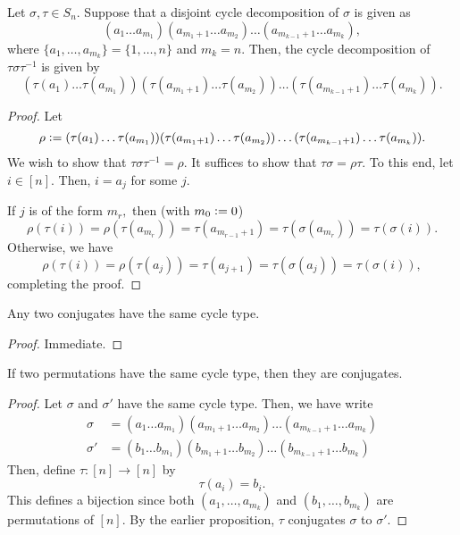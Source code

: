 \begin{prop}
	Let $\sigma, \tau \in S_n.$ Suppose that a disjoint cycle decomposition of $\sigma$ is given as
	\begin{equation*} 
		(a_1 \ldots a_{m_1})(a_{m_1 + 1} \ldots a_{m_2})\ldots(a_{m_{k-1} + 1} \ldots a_{m_k}),
	\end{equation*}
	where $\{a_1, \ldots, a_{m_k}\} = \{1, \ldots, n\}$ and $m_k = n.$ Then, the cycle decomposition of $\tau\sigma\tau^{-1}$ is given by
	\begin{equation*} 
		(\tau(a_1) \ldots \tau(a_{m_1}))(\tau(a_{m_1 + 1}) \ldots \tau(a_{m_2}))\ldots(\tau(a_{m_{k-1} + 1}) \ldots \tau(a_{m_k})).
	\end{equation*}
\end{prop}
\begin{proof} 
	Let 
	\begin{equation*} 
		\rho \vcentcolon= (\tau(a_1) \ldots \tau(a_{m_1}))(\tau(a_{m_1 + 1}) \ldots \tau(a_{m_2}))\ldots(\tau(a_{m_{k-1} + 1}) \ldots \tau(a_{m_k})).
	\end{equation*}
	We wish to show that $\tau\sigma\tau^{-1} = \rho.$ It suffices to show that $\tau\sigma = \rho\tau.$ To this end, let $i \in [n].$ Then, $i = a_{j}$ for some $j.$ 

	If $j$ is of the form $m_r,$ then (with $m_0 \vcentcolon= 0$)
	\begin{equation*} 
		\rho(\tau(i)) = \rho(\tau(a_{m_r})) = \tau(a_{m_{r-1} + 1}) = \tau(\sigma(a_{m_r})) = \tau(\sigma(i)).
	\end{equation*}
	Otherwise, we have
	\begin{equation*} 
		\rho(\tau(i)) = \rho(\tau(a_j)) = \tau(a_{j+1}) = \tau(\sigma(a_j)) = \tau(\sigma(i)),
	\end{equation*}
	completing the proof.
\end{proof}

\begin{cor}
	Any two conjugates have the same cycle type.
\end{cor}
\begin{proof} 
	Immediate.
\end{proof}

\begin{cor}
	If two permutations have the same cycle type, then they are conjugates.
\end{cor}
\begin{proof} 
	Let $\sigma$ and $\sigma'$ have the same cycle type. Then, we have write
	\begin{align*} 
		\sigma &= (a_1 \ldots a_{m_1})(a_{m_1 + 1} \ldots a_{m_2})\ldots(a_{m_{k-1} + 1} \ldots a_{m_k})\\
		\sigma' &= (b_1 \ldots b_{m_1})(b_{m_1 + 1} \ldots b_{m_2})\ldots(b_{m_{k-1} + 1} \ldots b_{m_k})
	\end{align*}
	Then, define $\tau:[n] \to [n]$ by
	\begin{equation*} 
		\tau(a_i) = b_i.
	\end{equation*}
	This defines a bijection since both $(a_1, \ldots, a_{m_k})$ and $(b_1, \ldots, b_{m_k})$ are permutations of $[n].$ By the earlier proposition, $\tau$ conjugates $\sigma$ to $\sigma'.$
\end{proof}

